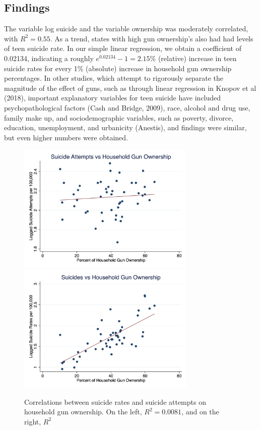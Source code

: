\documentclass{article}
\begin{document}
\subsection*{Findings}

The variable log suicide and the variable ownership was moderately correlated, with $R^2=0.55$. As a trend, states with high gun ownership's also had had levels of teen suicide rate. In our simple linear regression,  we obtain a coefficient of 0.02134, indicating a roughly $e^{0.02134}-1=2.15 \%$ (relative) increase in teen suicide rates for every 1\% (absolute) increase in household gun ownership percentages. In other studies, which attempt to rigorously separate the magnitude of the effect of guns, such as through linear regression in Knopov et al (2018), important explanatory variables for teen suicide have included psychopathological factors (Cash and Bridge, 2009), race, alcohol and drug use, family make up, and sociodemographic variables, such as poverty, divorce, education, unemployment, and urbanicity (Anestis), and findings were similar, but even higher numbers were obtained. \\

\begin{figure}[h]
\centering
\includegraphics[width=8.5cm]{graph1.png}
\includegraphics[width=8.5cm]{graph2.png}	
\caption{Correlations between suicide rates and suicide attempts on household gun ownership. On the left, $R^2 = 0.0081$, and on the right, $R^2$}
\end{figure}
\end{document}
